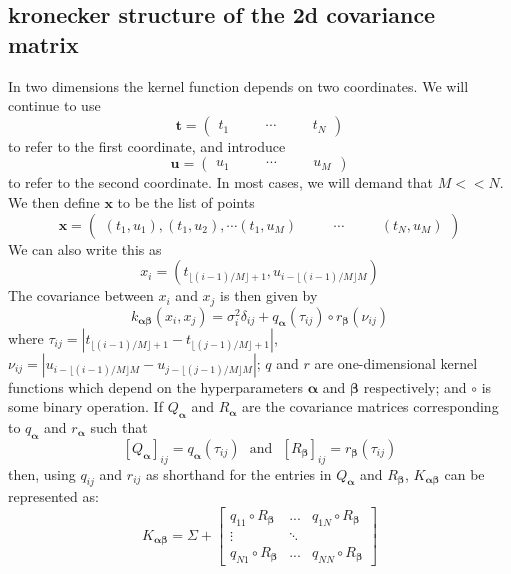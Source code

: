 \documentclass[modern]{aastex62}
\newcommand{\bvec}[1]{{\ensuremath{\boldsymbol{#1}}}}
\newcommand{\expandvec}[2]{\left(\begin{array}{ccccc} #1\quad && \cdots\quad && #2 \end{array}\right)}
\begin{document}
	\subsection{kronecker structure of the 2d covariance matrix}
	In two dimensions the kernel function depends on two coordinates. We will continue to use
	\begin{equation}
		\bvec{t} = \expandvec{t_1}{t_N}
	\end{equation}
	to refer to the first coordinate, and introduce
	\begin{equation}
		\bvec{u} = \expandvec{u_1}{u_M}
	\end{equation}
	to refer to the second coordinate. In most cases, we will demand that $M << N$. We then define $\bvec{x}$ to be the list of points
	\begin{equation}
		\bvec{x} = \expandvec{(t_1, u_1), (t_1, u_2), \cdots (t_1, u_M)}{(t_N, u_M)}
	\end{equation}
	We can also write this as
	\begin{equation}
		x_i = (t_{\lfloor(i-1)/M\rfloor + 1}, u_{i - \lfloor(i-1)/M\rfloor M})
	\end{equation} 
	The covariance between $x_i$ and $x_j$ is then given by
	\begin{equation}
		k_{\bvec{\alpha}\bvec{\beta}}(x_i, x_j) = \sigma_i^2\delta_{ij} + q_\bvec{\alpha}(\tau_{ij})\circ r_\bvec{\beta}(\nu_{ij})
	\end{equation}
	where $\tau_{ij} = |t_{\lfloor(i-1)/M\rfloor + 1}-t_{\lfloor(j-1)/M\rfloor + 1}|$, 
	$\nu_{ij} = |u_{i - \lfloor(i-1)/M\rfloor M}-u_{j - \lfloor(j-1)/M\rfloor M}|$; 
	$q$ and $r$ are one-dimensional kernel functions which depend on the hyperparameters $\bvec{\alpha}$ and 
	$\bvec{\beta}$ respectively; 
	and $\circ$ is some binary operation. 
	If $Q_\bvec{\alpha}$ and $R_\bvec{\alpha}$ are the covariance matrices corresponding to 
	$q_\bvec{\alpha}$ and $r_\bvec{\alpha}$ such that
	\begin{equation}
		\left[Q_\bvec{\alpha}\right]_{ij} = q_\bvec{\alpha}(\tau_{ij})\ \ \ \mathrm{and}\ \ \ \left[R_\bvec{\beta}\right]_{ij} = r_\bvec{\beta}(\tau_{ij})
	\end{equation} 
	then, using $q_{ij}$ and $r_{ij}$ as shorthand for the entries in $Q_\bvec{\alpha}$ and $R_\bvec{\beta}$, $K_\bvec{\alpha\beta}$ can be represented as: 
	\begin{equation}
		K_\bvec{\alpha\beta} = \Sigma + 
			\begin{bmatrix}
				q_{11}\circ R_\bvec{\beta} & ... & q_{1N}\circ R_\bvec{\beta} \\
				\vdots & \ddots & \\
				q_{N1}\circ R_\bvec{\beta} & ... & q_{NN}\circ R_\bvec{\beta}
			\end{bmatrix}
	\end{equation}
\end{document}
